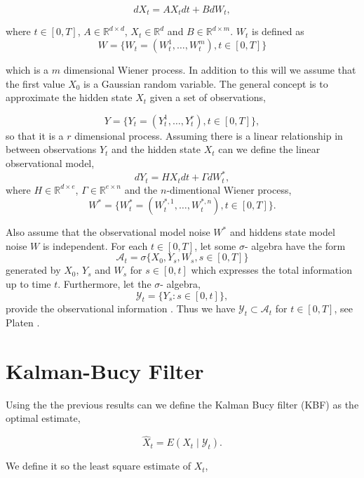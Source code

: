 \begin{equation*}
    dX_t = A X_t dt + B dW_t,
\end{equation*}

where $t \in [0,T]$, $A \in \mathbb{R} ^{ d \times d}$, $X_t \in \mathbb{R} ^{ d }$ and $B \in \mathbb{R}^{d \times m}$.  $W_t$ is defined as
\begin{equation}
    W = \{ W_t = (W_t^1, \dots, W^m_t), t \in [ 0, T ]  \}
\end{equation}

which is a $m$ dimensional Wiener process.  In addition to this will we assume that the first value $X_0$ is a Gaussian random variable. The general concept is to approximate the hidden state $X_t$ given a set of observations,

$$
Y = \{Y_t = (Y_t^1, \dots , Y_t^r), t \in [0, T]  \},
$$
so that it is a $r$ dimensional process. Assuming there is a linear relationship in between observations $Y_t$ and the hidden state $X_t$ can we define the linear observational model,
$$
dY_t = HX_t dt + \Gamma dW^*_t,
$$
where $H \in \mathbb{R}^{d \times e}$, $\Gamma \in \mathbb{R}^{e \times n}$ and the $n$-dimentional Wiener process,
\begin{equation}
    W^* = \{ W^*_t = (W^{*,1}_t, \dots, W^{*,n}_t), t \in [ 0, T ]  \}.
\end{equation}

Also assume that the observational model noise $W^*$ and hiddens state model noise $W$ is independent. For each $t \in [0,T]$, let some $\sigma$- algebra have the form
$$
\mathcal{A}_t = \sigma \{ X_0, Y_s, W_s, s \in [0,T] \}
$$
generated by $X_0$, $Y_s $ and $W_s$ for $s \in [0,t]$ which expresses the total information up to time $t$. Furthermore, let the $\sigma$- algebra,
$$
\mathcal{Y}_t = \{ Y_s: s \in [0,t]\},
$$
provide the observational information . Thus we have $\mathcal{Y}_t \subset \mathcal{A}_t$ for $t \in [0, T]$, see Platen \cite[p. 420]{PlatBrut10}.
\section{Kalman-Bucy Filter}

Using the the previous results can we define the Kalman Bucy filter (KBF) as the optimal estimate,

$$
\hat{X}_t = E(X_t \mid \mathcal{Y}_t).
$$

We define it so the least square estimate of $X_t$,


